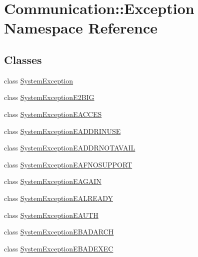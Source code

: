 \hypertarget{namespace_communication_1_1_exception}{}\section{Communication\+:\+:Exception Namespace Reference}
\label{namespace_communication_1_1_exception}
\subsection*{Classes}
\begin{DoxyCompactItemize}
\item 
class \hyperlink{class_communication_1_1_exception_1_1_system_exception}{System\+Exception}
\item 
class \hyperlink{class_communication_1_1_exception_1_1_system_exception_e2_b_i_g}{System\+Exception\+E2\+B\+I\+G}
\item 
class \hyperlink{class_communication_1_1_exception_1_1_system_exception_e_a_c_c_e_s}{System\+Exception\+E\+A\+C\+C\+E\+S}
\item 
class \hyperlink{class_communication_1_1_exception_1_1_system_exception_e_a_d_d_r_i_n_u_s_e}{System\+Exception\+E\+A\+D\+D\+R\+I\+N\+U\+S\+E}
\item 
class \hyperlink{class_communication_1_1_exception_1_1_system_exception_e_a_d_d_r_n_o_t_a_v_a_i_l}{System\+Exception\+E\+A\+D\+D\+R\+N\+O\+T\+A\+V\+A\+I\+L}
\item 
class \hyperlink{class_communication_1_1_exception_1_1_system_exception_e_a_f_n_o_s_u_p_p_o_r_t}{System\+Exception\+E\+A\+F\+N\+O\+S\+U\+P\+P\+O\+R\+T}
\item 
class \hyperlink{class_communication_1_1_exception_1_1_system_exception_e_a_g_a_i_n}{System\+Exception\+E\+A\+G\+A\+I\+N}
\item 
class \hyperlink{class_communication_1_1_exception_1_1_system_exception_e_a_l_r_e_a_d_y}{System\+Exception\+E\+A\+L\+R\+E\+A\+D\+Y}
\item 
class \hyperlink{class_communication_1_1_exception_1_1_system_exception_e_a_u_t_h}{System\+Exception\+E\+A\+U\+T\+H}
\item 
class \hyperlink{class_communication_1_1_exception_1_1_system_exception_e_b_a_d_a_r_c_h}{System\+Exception\+E\+B\+A\+D\+A\+R\+C\+H}
\item 
class \hyperlink{class_communication_1_1_exception_1_1_system_exception_e_b_a_d_e_x_e_c}{System\+Exception\+E\+B\+A\+D\+E\+X\+E\+C}
\item 

\end{DoxyCompactItemize}

